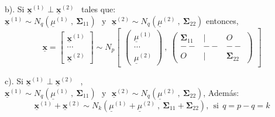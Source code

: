 \documentclass[
]{book}
\theoremstyle{definition}
\theoremstyle{definition}
\theoremstyle{definition}
\theoremstyle{definition}
\theoremstyle{remark}
\begin{document}
b). Si \(\underline{\mathbf{x}}^{(1)} \perp \underline{\mathbf{x}}^{(2)}\) ~tales que: ~\\
\(\underline{\mathbf{x}}^{(1)} \sim N_q\left(\underline{\mu}^{(1)}\ , \ \mathbf{\Sigma}_{11}\right) \ \ \ \text{y} \ \ \ \underline{\mathbf{x}}^{(2)} \sim N_q\left(\underline{\mu}^{(2)}\ , \ \mathbf{\Sigma}_{22}\right)\)
entonces,
\begin{equation}
\underline{\mathbf{x}}=\begin{bmatrix}
\underline{\mathbf{x}}^{(1)} \\ \cdots \\ \underline{\mathbf{x}}^{(2)}
\end{bmatrix} \sim N_{p} \begin{bmatrix}
\begin{pmatrix}
\underline{\mu}^{(1)} \\ \cdots \\ \underline{\mu}^{(2)}
\end{pmatrix} \ , \ \begin{pmatrix}
\mathbf{\Sigma}_{11} & | & O \\
-- & -- & -- \\
O & | & \mathbf{\Sigma}_{22}
\end{pmatrix}
\end{bmatrix}
\label{eq:prop-5b}
\end{equation}

c). Si \(\underline{\mathbf{x}}^{(1)} \perp \underline{\mathbf{x}}^{(2)}\) ~, ~\\
\(\underline{\mathbf{x}}^{(1)} \sim N_q\left(\underline{\mu}^{(1)}\ , \ \mathbf{\Sigma}_{11}\right) \ \ \ \text{y} \ \ \ \underline{\mathbf{x}}^{(2)} \sim N_q\left(\underline{\mu}^{(2)}\ , \ \mathbf{\Sigma}_{22}\right)\), Además:
\begin{equation}
\underline{\mathbf{x}}^{(1)}+\underline{\mathbf{x}}^{(2)} \sim N_{k} \left(\underline{\mu}^{(1)}+\underline{\mu}^{(2)} \ , \ \mathbf{\Sigma}_{11}+\mathbf{\Sigma}_{22} \right), \ \ \text{si} \ \ q=p-q=k
\label{eq:prop-5c}
\end{equation}
\end{document}
